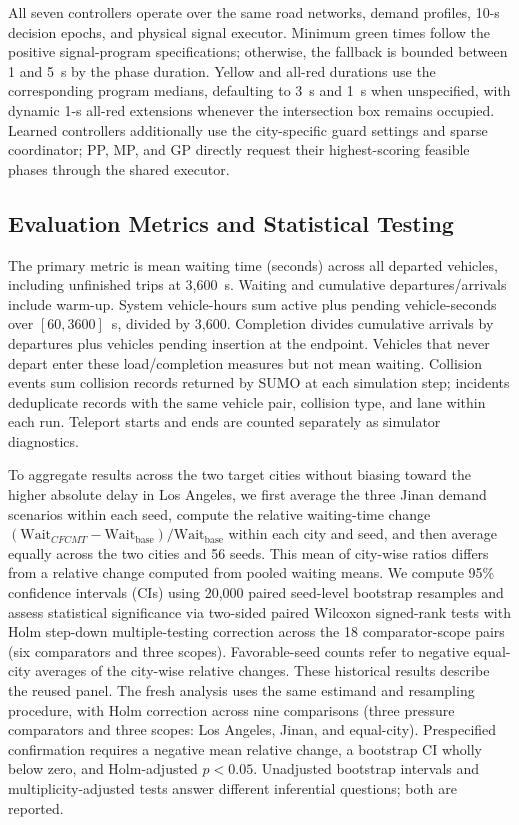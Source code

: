 \documentclass[letterpaper,journal]{IEEEtran}
\newcommand{\method}{CFCMT}
\begin{document}
All seven controllers operate over the same road networks, demand profiles, 10-s decision epochs, and physical signal executor. Minimum green times follow the positive signal-program specifications; otherwise, the fallback is bounded between 1 and 5~s by the phase duration. Yellow and all-red durations use the corresponding program medians, defaulting to 3~s and 1~s when unspecified, with dynamic 1-s all-red extensions whenever the intersection box remains occupied. Learned controllers additionally use the city-specific guard settings and sparse coordinator; PP, MP, and GP directly request their highest-scoring feasible phases through the shared executor.

\subsection{Evaluation Metrics and Statistical Testing}
The primary metric is mean waiting time (seconds) across all departed vehicles, including unfinished trips at 3,600~s. Waiting and cumulative departures/arrivals include warm-up. System vehicle-hours sum active plus pending vehicle-seconds over $[60,3600]$~s, divided by 3,600. Completion divides cumulative arrivals by departures plus vehicles pending insertion at the endpoint. Vehicles that never depart enter these load/completion measures but not mean waiting. Collision events sum collision records returned by SUMO at each simulation step; incidents deduplicate records with the same vehicle pair, collision type, and lane within each run. Teleport starts and ends are counted separately as simulator diagnostics.

To aggregate results across the two target cities without biasing toward the higher absolute delay in Los Angeles, we first average the three Jinan demand scenarios within each seed, compute the relative waiting-time change $(\text{Wait}_{\method} - \text{Wait}_{\mathrm{base}}) / \text{Wait}_{\mathrm{base}}$ within each city and seed, and then average equally across the two cities and 56 seeds. This mean of city-wise ratios differs from a relative change computed from pooled waiting means. We compute 95\% confidence intervals (CIs) using 20,000 paired seed-level bootstrap resamples and assess statistical significance via two-sided paired Wilcoxon signed-rank tests with Holm step-down multiple-testing correction across the 18 comparator-scope pairs (six comparators and three scopes). Favorable-seed counts refer to negative equal-city averages of the city-wise relative changes. These historical results describe the reused panel. The fresh analysis uses the same estimand and resampling procedure, with Holm correction across nine comparisons (three pressure comparators and three scopes: Los Angeles, Jinan, and equal-city). Prespecified confirmation requires a negative mean relative change, a bootstrap CI wholly below zero, and Holm-adjusted $p<0.05$. Unadjusted bootstrap intervals and multiplicity-adjusted tests answer different inferential questions; both are reported.
\end{document}
